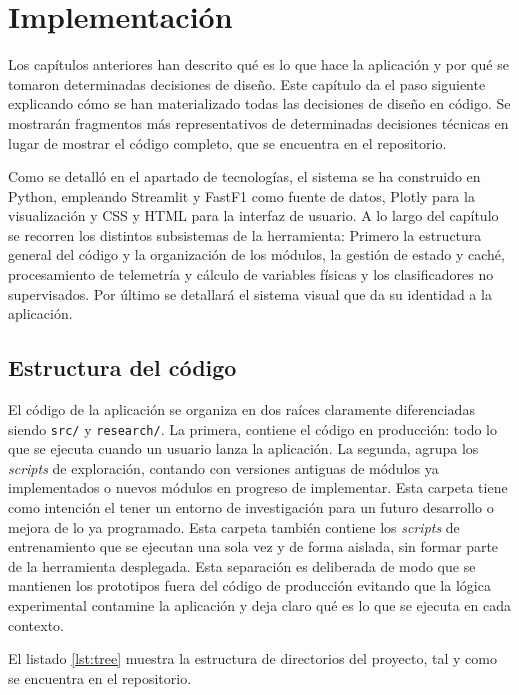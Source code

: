 \documentclass[12pt,a4paper,twoside,openright]{book}
\begin{document}
\chapter{Implementación}
\noindent Los capítulos anteriores han descrito qué es lo que hace la aplicación y por qué se tomaron determinadas decisiones de diseño. Este capítulo da el paso siguiente explicando cómo se han materializado todas las decisiones de diseño en código.
Se mostrarán fragmentos más representativos de determinadas decisiones técnicas en lugar de mostrar el código completo, que se encuentra en el repositorio.

\noindent Como se detalló en el apartado de tecnologías, el sistema se ha construido en Python, empleando Streamlit y FastF1 como fuente de datos, Plotly para la visualización y CSS y HTML para la interfaz de usuario.
A lo largo del capítulo se recorren los distintos subsistemas de la herramienta: Primero la estructura general del código y la organización de los módulos, la gestión de estado y caché, procesamiento de telemetría y cálculo de variables físicas y los clasificadores no supervisados. Por último se detallará el sistema visual que da su identidad a la aplicación.

\section{Estructura del código}
El código de la aplicación se organiza en dos raíces claramente diferenciadas siendo \texttt{src/} y \texttt{research/}. La primera, contiene el código en producción: todo lo que se ejecuta cuando un usuario lanza la aplicación. La segunda, agrupa los \textit{scripts} de exploración, contando con versiones antiguas de módulos ya implementados o nuevos módulos en progreso de implementar. Esta carpeta tiene como intención el tener un entorno de investigación para un futuro desarrollo o mejora de lo ya programado.
Esta carpeta también contiene los \textit{scripts} de entrenamiento que se ejecutan una sola vez y de forma aislada, sin formar parte de la herramienta desplegada. Esta separación es deliberada de modo que se mantienen los prototipos fuera del código de producción evitando que la lógica experimental contamine la aplicación y deja claro qué es lo que se ejecuta en cada contexto.

\noindent El listado \ref{lst:tree} muestra la estructura de directorios del proyecto, tal y como se encuentra en el repositorio.
\end{document}
